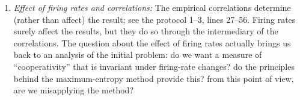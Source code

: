 \documentclass{article}
\begin{document}
\begin{enumerate}[wide]
\item \emph{Effect of firing rates and correlations:} The empirical
  correlations determine (rather than affect) the result; see the protocol
  1--3, lines 27--56. Firing rates surely affect the results, but they do
  so through the intermediary of the correlations. The question about the
  effect of firing rates actually brings us back to an analysis of the
  initial problem: do we want a measure of \enquote{cooperativity} that is
  invariant under firing-rate changes? do the principles behind the
  maximum-entropy method provide this? from this point of view, are we
  misapplying the method?
  

\end{enumerate}
\end{document}
